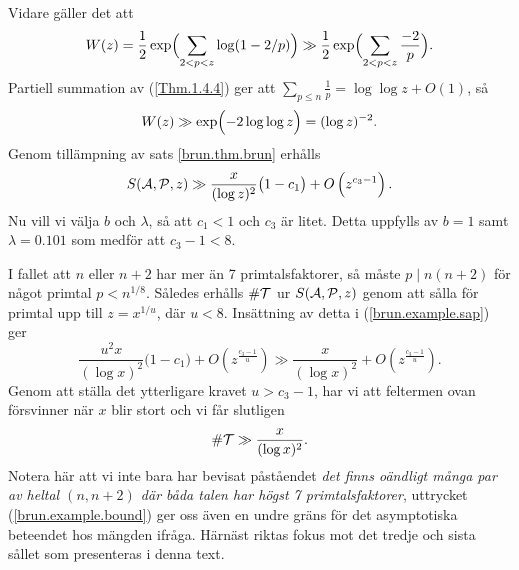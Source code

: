 Vidare gäller det att 
\begin{align*}
    W(z) = \frac{1}{2}\exp\Bigl(\sum_{2<p<z} \log(1-2/p) \Bigr) 
    \gg \frac{1}{2}\exp\Bigl(\sum_{2<p<z} \frac{-2}{p} \Bigr).
\end{align*}
Partiell summation av (\ref{Thm.1.4.4}) ger att $\sum_{p\leq n}\frac{1}{p} = \log\log z + O(1)$, så
\begin{align*}
    W(z) \gg \exp\Bigl(-2\log\log z\Bigr)
    = (\log z)^{-2}.
\end{align*}
Genom tillämpning av sats \ref{brun.thm.brun} erhålls
\begin{equation} \label{brun.example.sap}
    \S{A}{P}{z} \gg \frac{x}{(\log z)^2}\bigl(1 - c_1\bigr) + O\left(z^{c_3 - 1}\right).
\end{equation}
Nu vill vi välja $b$ och $\lambda$, så att $c_1<1$ och $c_3$ är litet. 
Detta uppfylls av $b=1$ samt $\lambda=0.101$ som medför att $c_3-1<8$.

I fallet att $n$ eller $n+2$ har mer än 7 primtalsfaktorer,
så måste $p\mid n(n+2)$ för något primtal $p < n^{1/8}$.
Således erhålls $\card\mathcal{T}$ ur $\S{A}{P}{z}$ genom att sålla för primtal upp till $z = x^{1/u}$, där $u<8$.
Insättning av detta i (\ref{brun.example.sap}) ger
\begin{equation*}
    \frac{u^2x}{(\log x)^2}\bigl(1 - c_1\bigr) + O\left(z^{\frac{c_3 - 1}{u}}\right) \gg 
    \frac{x}{(\log x)^2} + O\left(z^{\frac{c_3 - 1}{u}}\right).
\end{equation*}
Genom att ställa det ytterligare kravet $u>c_3-1$, har vi att feltermen ovan försvinner när $x$ blir stort och vi får slutligen
\begin{equation} \label{brun.example.bound}
    \card\mathcal{T} \gg \frac{x}{(\log x)^2}.
\end{equation}
Notera här att vi inte bara har bevisat påståendet \textit{det finns oändligt många par av heltal $(n,n+2)$ där båda talen har högst 7 primtalsfaktorer},
uttrycket (\ref{brun.example.bound}) ger oss även en undre gräns för det asymptotiska beteendet hos mängden ifråga.
Härnäst riktas fokus mot det tredje och sista sållet som presenteras i denna text.




